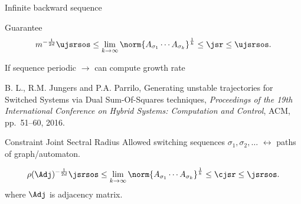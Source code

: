\documentclass{beamer}
\begin{document}
  \begin{frame}{Infinite backward sequence}
    \begin{alert}{Guarantee}
      \[ m^{-\frac{1}{2d}}\ujsrsos \leq \lim_{k \to \infty} \norm{A_{\sigma_1} \cdots A_{\sigma_k}}^{\frac{1}{k}} \leq \jsr \leq \ujsrsos. \]
    \end{alert}

    If sequence \alert{periodic} $\to$ can compute growth rate

    \vfill

    {\scriptsize
    B. L., R.M. Jungers and P.A. Parrilo,
    Generating unstable trajectories for Switched Systems via Dual Sum-Of-Squares techniques,
    \emph{Proceedings of the 19th International Conference on Hybrid Systems: Computation and Control},
    ACM, pp.~51--60, 2016.
    }
  \end{frame}
  \begin{frame}{Constraint Joint Sectral Radius}
    Allowed switching sequences $\sigma_1, \sigma_2, \ldots$ $\leftrightarrow$ paths of graph/automaton.

    \[ \rho(\Adj)^{-\frac{1}{2d}}\jsrsos \leq \lim_{k \to \infty} \norm{A_{\sigma_1} \cdots A_{\sigma_k}}^{\frac{1}{k}} \leq \cjsr \leq \jsrsos. \]
    where $\Adj$ is adjacency matrix.
  \end{frame}
\end{document}
